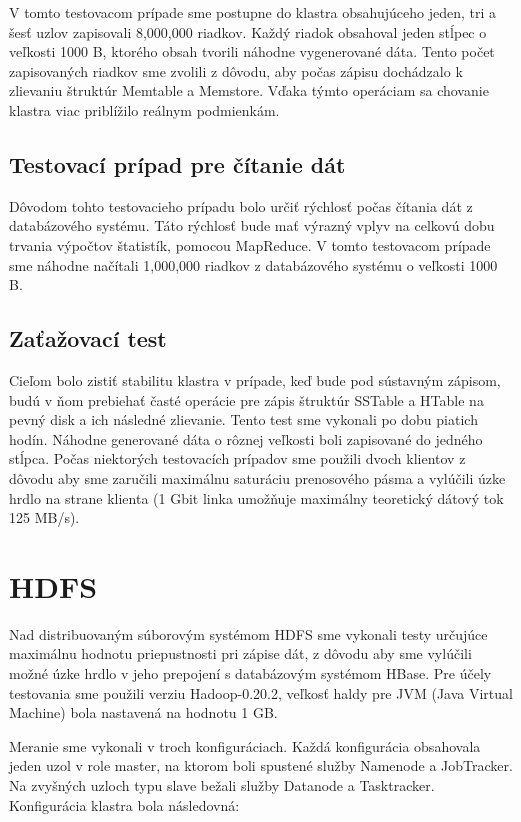 \documentclass[11pt,twoside,a4paper]{book}
\begin{document}
V tomto testovacom prípade sme postupne do klastra obsahujúceho jeden, tri a šesť uzlov zapisovali 8,000,000 riadkov. Každý riadok obsahoval jeden stĺpec o veľkosti 1000 B, ktorého obsah tvorili náhodne vygenerované dáta. Tento počet zapisovaných riadkov sme zvolili z dôvodu, aby počas zápisu dochádzalo k zlievaniu štruktúr Memtable a Memstore. Vďaka týmto operáciam sa chovanie klastra viac priblížilo reálnym podmienkám.

\subsection{Testovací prípad pre čítanie dát}

Dôvodom tohto testovacieho prípadu bolo určiť rýchlosť počas čítania dát z databázového systému. Táto rýchlosť bude mať výrazný vplyv na celkovú dobu trvania výpočtov štatistík, pomocou MapReduce. V tomto testovacom prípade sme náhodne načítali 1,000,000 riadkov z databázového systému o veľkosti 1000 B.

\subsection{Zaťažovací test}

Cieľom bolo zistiť stabilitu klastra v prípade, keď bude pod sústavným zápisom, budú v ňom prebiehať časté operácie pre zápis štruktúr SSTable a HTable na pevný disk a ich následné zlievanie. Tento test sme vykonali po dobu piatich hodín. Náhodne generované dáta o rôznej veľkosti boli zapisované do jedného stĺpca. Počas niektorých testovacích prípadov sme použili dvoch klientov z dôvodu aby sme zaručili maximálnu saturáciu prenosového pásma a vylúčili úzke hrdlo na strane klienta (1 Gbit linka umožňuje maximálny teoretický dátový tok 125 MB/s).


\section{HDFS}
Nad distribuovaným súborovým systémom HDFS sme vykonali testy určujúce maximálnu hodnotu priepustnosti pri zápise dát, z dôvodu aby sme vylúčili možné úzke hrdlo v jeho prepojení s databázovým systémom HBase. Pre účely testovania sme použili verziu Hadoop-0.20.2, veľkosť haldy pre JVM (Java Virtual Machine) bola nastavená na hodnotu 1 GB.

Meranie sme vykonali v troch konfiguráciach. Každá konfigurácia obsahovala jeden uzol v role master, na ktorom boli spustené služby Namenode a JobTracker. Na zvyšných uzloch typu slave bežali služby Datanode a Tasktracker. Konfigurácia klastra bola následovná:
\end{document}
